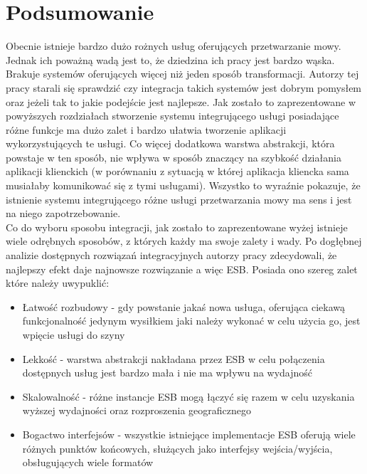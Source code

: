 
\chapter{Podsumowanie} %



\ifpdf
    \graphicspath{{7/figures/PNG/}{7/figures/PDF/}{7/figures/}}
\else
    \graphicspath{{7/figures/EPS/}{7/figures/}}
\fi

Obecnie istnieje bardzo dużo rożnych usług oferujących przetwarzanie mowy. Jednak ich poważną wadą jest to, że dziedzina ich pracy jest bardzo wąska. Brakuje systemów oferujących więcej niż jeden sposób transformacji. Autorzy tej pracy starali się sprawdzić czy integracja takich systemów jest dobrym pomysłem oraz jeżeli tak to jakie podejście jest najlepsze. Jak zostało to zaprezentowane w powyższych rozdziałach stworzenie systemu integrującego usługi posiadające różne funkcje ma dużo zalet i bardzo ułatwia tworzenie aplikacji wykorzystujących te usługi. Co więcej dodatkowa warstwa abstrakcji, która powstaje w ten sposób, nie wpływa w sposób znaczący na szybkość działania aplikacji klienckich (w porównaniu z sytuacją w której aplikacja kliencka sama musiałaby komunikować się z tymi usługami). Wszystko to wyraźnie pokazuje, że istnienie systemu integrującego różne usługi przetwarzania mowy ma sens i jest na niego zapotrzebowanie. \\
Co do wyboru sposobu integracji, jak zostało to zaprezentowane wyżej istnieje wiele odrębnych sposobów, z których każdy ma swoje zalety i wady. Po dogłębnej analizie dostępnych rozwiązań integracyjnych autorzy pracy zdecydowali, że najlepszy efekt daje najnowsze rozwiązanie a więc ESB. Posiada ono szereg zalet które należy uwypuklić:
\begin{itemize}
	\item Łatwość rozbudowy - gdy powstanie jakaś nowa usługa, oferująca ciekawą funkcjonalność jedynym wysiłkiem jaki należy wykonać w celu użycia go, jest wpięcie usługi do szyny
	\item Lekkość - warstwa abstrakcji nakładana przez ESB w celu połączenia dostępnych usług jest bardzo mała i nie ma wpływu na wydajność
	\item Skalowalność - różne instancje ESB mogą łączyć się razem w celu uzyskania wyższej wydajności oraz rozproszenia geograficznego
	\item Bogactwo interfejsów - wszystkie istniejące implementacje ESB oferują wiele różnych punktów końcowych, służących jako interfejsy wejścia/wyjścia, obsługujących wiele formatów
\end{itemize}
